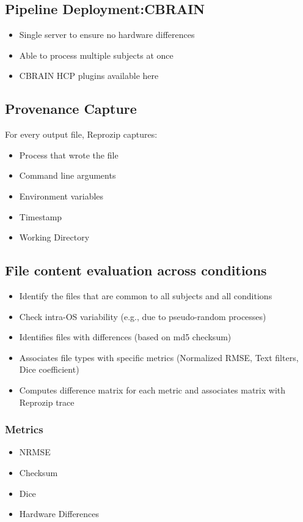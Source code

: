 \subsection{Pipeline Deployment:CBRAIN}
\begin{itemize}
  \item Single server to ensure no hardware differences
  \item Able to process multiple subjects at once
  \item CBRAIN HCP plugins available here
\end{itemize}

\subsection{Provenance Capture}
\begin{flushleft}
For every output file, Reprozip captures: 
\end{flushleft}
\begin{itemize}
  \item Process that wrote the file
  \item Command line arguments
  \item Environment variables
  \item Timestamp
  \item Working Directory
\end{itemize}

\subsection{File content evaluation across conditions}
\begin{itemize}
 \item Identify the files that are common to all subjects and all conditions
 \item Check intra-OS variability (e.g., due to pseudo-random processes)
 \item Identifies files with differences (based on md5 checksum)
 \item Associates file types with specific metrics (Normalized RMSE, Text filters, Dice coefficient)
 \item Computes difference matrix for each metric and associates matrix with Reprozip trace
\end{itemize}

\subsubsection{Metrics}
\begin{itemize}
\item NRMSE
\item Checksum
\item Dice
\item Hardware Differences
\end{itemize}


